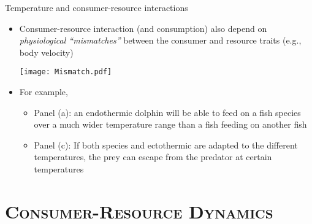 \begin{frame}{Temperature and consumer-resource interactions}

\begin{itemize}[<+->]\setlength{\itemindent}{-1em}
    \item Consumer-resource interaction (and consumption) also depend on {\it physiological ``mismatches''} between the consumer and resource traits (e.g., body velocity)
    \begin{center}
      \texttt{[image: Mismatch.pdf]}
    \end{center}          
    \item For example, 
      \begin{itemize}\setlength{\itemindent}{-1em}
        \item Panel (a): an endothermic dolphin will be able to feed on a fish species over a much wider temperature range than a fish feeding on another fish
        \item Panel (c): If both species and ectothermic are adapted to the different temperatures, the prey can escape from the predator at certain temperatures 
    \end{itemize}
\end{itemize}

\end{frame}

\section{\scshape Consumer-Resource Dynamics}


